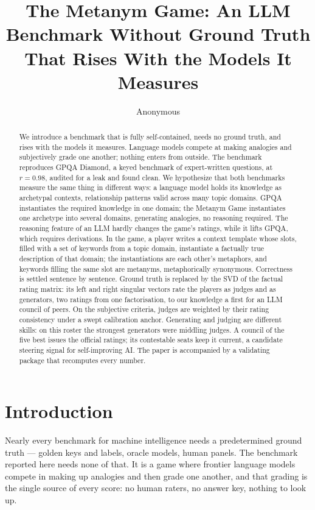\documentclass{article}
\title{The Metanym Game: An LLM Benchmark Without Ground Truth That Rises With the Models It Measures}
\author{Anonymous}
\begin{document}
\maketitle
\begin{abstract}

We introduce a benchmark that is fully self-contained, needs no ground truth, and rises with the models it measures. Language models compete at making analogies and subjectively grade one another; nothing enters from outside. The benchmark reproduces GPQA Diamond, a keyed benchmark of expert-written questions, at \(r = 0.98\), audited for a leak and found clean. We hypothesize that both benchmarks measure the same thing in different ways: a language model holds its knowledge as archetypal contexts, relationship patterns valid across many topic domains. GPQA instantiates the required knowledge in one domain; the Metanym Game instantiates one archetype into several domains, generating analogies, no reasoning required. The reasoning feature of an LLM hardly changes the game's ratings, while it lifts GPQA, which requires derivations. In the game, a player writes a context template whose slots, filled with a set of keywords from a topic domain, instantiate a factually true description of that domain; the instantiations are each other's metaphors, and keywords filling the same slot are metanyms, metaphorically synonymous. Correctness is settled sentence by sentence. Ground truth is replaced by the SVD of the factual rating matrix: its left and right singular vectors rate the players as judges and as generators, two ratings from one factorisation, to our knowledge a first for an LLM council of peers. On the subjective criteria, judges are weighted by their rating consistency under a swept calibration anchor. Generating and judging are different skills: on this roster the strongest generators were middling judges. A council of the five best issues the official ratings; its contestable seats keep it current, a candidate steering signal for self-improving AI. The paper is accompanied by a validating package that recomputes every number.

\end{abstract}
\section{Introduction}\label{introduction}

Nearly every benchmark for machine intelligence needs a predetermined ground truth --- golden keys and labels, oracle models, human panels. The benchmark reported here needs none of that. It is a game where frontier language models compete in making up analogies and then grade one another, and that grading is the single source of every score: no human raters, no answer key, nothing to look up.
\end{document}
